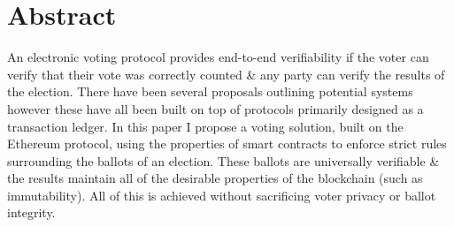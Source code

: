 \documentclass{article}
\begin{document}
    \section{Abstract}
   An electronic voting protocol provides end-to-end verifiability if the voter can verify that their vote was correctly counted \& any party can verify the results of the election. There have been several proposals outlining potential systems however these have all been built on top of protocols primarily designed as a transaction ledger. In this paper I propose a voting solution, built on the Ethereum protocol, using the properties of smart contracts to enforce strict rules surrounding the ballots of an election. These ballots are universally verifiable \& the results maintain all of the desirable properties of the blockchain (such as immutability). All of this is achieved without sacrificing voter privacy or ballot integrity.
\end{document}
